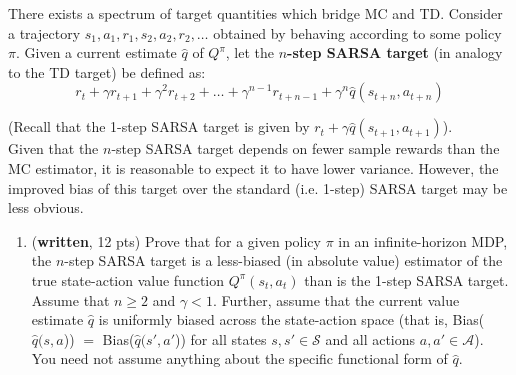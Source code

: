 \documentclass{article}
\begin{document}
There exists a spectrum of target quantities which bridge MC and TD. Consider a trajectory $s_1,a_1,r_1,s_2,a_2,r_2,\ldots$ obtained by behaving according to some policy $\pi$. Given a current estimate $\hat{q}$ of $Q^{\pi}$, let the \textbf{$n$-step SARSA target} (in analogy to the TD target) be defined as:
\[
r_t + \gamma r_{t+1} + \gamma^2 r_{t+2} + \ldots + \gamma^{n-1}r_{t + n -1} + \gamma^{n}\hat{q}(s_{t+n},a_{t+n})
\]

(Recall that the 1-step SARSA target is given by $r_t + \gamma \hat{q}(s_{t+1},a_{t+1})$).\\

Given that the $n$-step SARSA target depends on fewer sample rewards than the MC estimator, it is reasonable to expect it to have lower variance. However, the improved bias of this target over the standard (i.e. 1-step) SARSA target may be less obvious.

\begin{enumerate}
\item (\textbf{written}, 12 pts) Prove that for a given policy $\pi$ in an infinite-horizon MDP, the $n$-step SARSA target is a less-biased (in absolute value) estimator of the true state-action value function $Q^{\pi}(s_t,a_t)$ than is the 1-step SARSA target. Assume that $n \geq 2$ and $\gamma < 1$. Further, assume that the current value estimate $\hat{q}$ is uniformly biased across the state-action space (that is, Bias($\hat{q}(s, a$)) $=$ Bias($\hat{q}(s', a'$)) for all states $s, s' \in \mathcal{S}$ and all actions $a, a' \in\mathcal{A}$). You need not assume anything about the specific functional form of $\hat{q}$.
\end{enumerate}

\printbibliography
\end{document}
